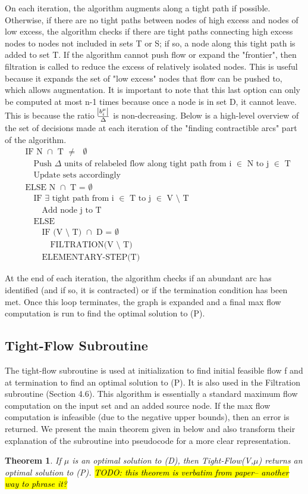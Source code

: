 \documentclass[11pt]{article}
\newtheorem{theorem}{Theorem}[section]
\theoremstyle{definition}
\theoremstyle{definition}
\newcommand{\todo}[1]{\hl{TODO: #1}}
\begin{document}
	On each iteration, the algorithm augments along a tight path if possible. Otherwise, if there are no tight paths between nodes of high excess and nodes of low excess, the algorithm checks if there are tight paths connecting high excess nodes to nodes not included in sets T or S; if so, a node along this tight path is added to set T. If the algorithm cannot push flow or expand the "frontier", then filtration is called to reduce the excess of relatively isolated nodes. This is useful because it expands the set of "low excess" nodes that flow can be pushed to, which allows augmentation. It is important to note that this last option can only be computed at most n-1 times because once a node is in set D, it cannot leave. This is because the ratio $\frac{\abs{b_i^\mu}}{\Delta}$ is non-decreasing. Below is a high-level overview of the set of decisions made at each iteration of the "finding contractible arcs" part of the algorithm.
	\begin{align*}
	&\text{IF N $\cap$ T $\neq$ $\emptyset$} \\
	&\quad \text{Push $\Delta$ units of relabeled flow along tight path from i $\in$ N to j $\in$ T} \\ 
	&\quad \text{Update sets accordingly} \\
	&\text{ELSE N $\cap$ T = $\emptyset$} \\
	&\quad \text{IF $\exists$ tight path from i $\in$ T to j $\in$ V $\setminus$ T} \\
	&\quad \quad \text{Add node j to T} \\
	&\quad \text{ELSE} \\
	&\quad \quad \text{IF (V $\setminus$ T) $\cap$ D = $\emptyset$} \\
	&\quad \quad \quad \text{FILTRATION(V $\setminus$ T)} \\
	&\quad \quad \text{ELEMENTARY-STEP(T)} 
	\end{align*}
	
	At the end of each iteration, the algorithm checks if an abundant arc has identified (and if so, it is contracted) or if the termination condition has been met. Once this loop terminates, the graph is expanded and a final max flow computation is run to find the optimal solution to (P).
	\subsection{Tight-Flow Subroutine}
	The tight-flow subroutine is used at initialization to find initial feasible flow f and at termination to find an optimal solution to (P). It is also used in the Filtration subroutine (Section 4.6). This algorithm is essentially a standard maximum flow computation on the input set and an added source node. If the max flow computation is infeasible (due to the negative upper bounds), then an error is returned. We present the main theorem given in \cite{Vegh2013} below and also transform their explanation of the subroutine into pseudocode for a more clear representation.
	\begin{theorem}
	If $\mu$ is an optimal solution to (D), then Tight-Flow(V,$\mu$) returns an optimal solution to (P). \todo{this theorem is verbatim from paper-- another way to phrase it?}
	\end{theorem}
	
\end{document}
